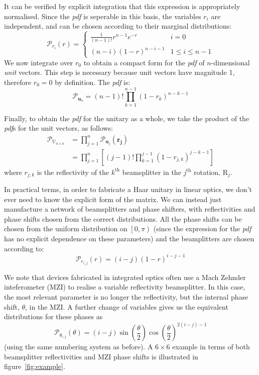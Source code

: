 \documentclass[aps,prl,twocolumn,floatfix]{revtex4}
\renewcommand{\vec}[1]{\mathbf{#1}}
\newcommand{\mat}[1]{\mathrm{#1}}
\newcommand{\by}{\times}
\newcommand{\of}[1]{\!\left(#1\right)}
\newcommand{\pdf}{{\it pdf}}
\newcommand{\prob}[1]{\mathcal{#1}}
\begin{document}
It can be verified by explicit integration that this expression is appropriately
normalised. Since the \pdf{} is seperable in this basis, the variables \( r_i
\) are independent, and can be chosen according to their marginal distributions:
\begin{equation}
  \prob{P}_{r_i} \of{ r } = \left\{ \begin{matrix}
    \frac{1}{ \left( n-1 \right)! } r^{n-1} e^{-r} & i=0 \\
    \left( n-i \right) \left( 1-r \right)^{n-i-1} & 1 \leq i \leq n-1
  \end{matrix} \right.
\end{equation}
We now integrate over \(r_{0}\) to obtain a compact form for the \pdf{} of
\(n\)-dimensional \emph{unit} vectors. This step is necessary because unit
vectors have magnitude 1, therefore \(r_0=0\) by definition. The \pdf{} is:
\begin{equation}
  \prob{P}_{ \vec{u}_n } = \left( n-1 \right)! \prod_{k=1}^{n-1} \left( 1-r_k
  \right)^{n-k-1}
\end{equation}

Finally, to obtain the \pdf{} for the unitary as a whole, we take the product
of the \pdf{}s for the unit vectors, as follows:
\begin{align*}
  \prob{P}_{\mat{U}_{n \by n}} &= \prod_{j=1}^{n} \prob{P}_{\vec{u}_j}
  \of{\vec{r_j}} \\
  &= \prod_{j=1}^{n} \left[ \left( j-1 \right)! \prod_{k=1}^{j-1} \left(
  1-r_{j,k} \right)^{j-k-1} \right]
\end{align*}
where \( r_{j,k} \) is the reflectivity of the \( k^{\text{th}} \) beamsplitter
in the \( j^{\text{th}} \) rotation, \( \mat{R}_j \).

In practical terms, in order to fabricate a Haar unitary in linear optics, we
don't ever need to know the explicit form of the matrix. We can instead just
manufacture a network of beamsplitters and phase shifters, with reflectivities
and phase shifts chosen from the correct distributions. All the phase shifts can
be chosen from the uniform distribution on \( \left[ 0,\pi \right) \) (since the
expression for the \pdf{} has no explicit dependence on these parameters) and
the beamplitters are chosen according to:
\begin{equation}
  \prob{P}_{r_{i,j}}\of{r} = \left( i-j \right) \left( 1-r \right)^{i-j-1}
\end{equation}

We note that devices fabricated in integrated optics often use a Mach Zehnder
inteferometer (MZI) to realise a variable reflectivity beamsplitter. In this
case, the most relevant parameter is no longer the reflectivity, but the
internal phase shift, \(\theta\), in the MZI. A further change of variables
gives us the equivalent distributions for these phases as
\begin{equation}
  \prob{P}_{\theta_{i,j}}\of{\theta} = \left( i-j \right) \sin
  \of{\frac{\theta}{2}} \cos \of{\frac{\theta}{2}}^{2 \left(i-j\right)-1} 
\end{equation}
(using the same numbering system as before).
A \( 6 \by 6 \) example in terms of both beamsplitter reflectivities and MZI
phase shifts is illustrated in figure~\ref{fig:example}.
\end{document}
